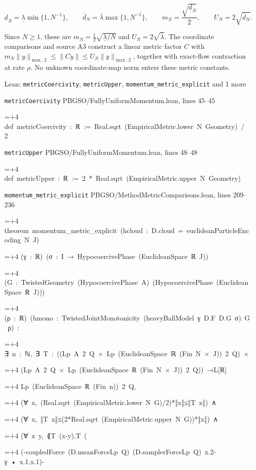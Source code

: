 \documentclass[11pt,a4paper]{report}
\newlength{\leancharwidth}
\newenvironment{leancode}{\par\smallskip\begingroup\ttfamily\footnotesize\raggedright
  \settowidth{\leancharwidth}{M}\setlength{\parskip}{0pt}\setlength{\parindent}{0pt}
  \frenchspacing}{\par\endgroup\smallskip}
\newcommand{\leanline}[2]{\hangindent=\dimexpr#1\leancharwidth+4\leancharwidth\relax
  \hangafter=1\noindent\hspace*{#1\leancharwidth}#2\par}
\newcommand{\leansource}[1]{\par{\footnotesize\color{leanmuted}#1}\par}
\begin{document}
\[\underline d_N=\underline\lambda\min\{1,N^{-1}\},\qquad\overline d_N=\overline\lambda\max\{1,N^{-1}\},\qquad m_N=\frac{\sqrt{\underline d_N}}2,\qquad U_N=2\sqrt{\overline d_N}.\]





Since \(N\ge1\), these are \(m_N=\tfrac12\sqrt{\underline\lambda/N}\) and \(U_N=2\sqrt{\overline\lambda}\). The coordinate comparisons and source A3 construct a linear metric factor \(C\) with \(m_N\|y\|_{\max,2}\le\|Cy\|\le U_N\|y\|_{\max,2}\), together with exact-flow contraction at rate \(\rho\). No unknown coordinate-map norm enters these metric constants.

\begin{leanbox}{Lean: \texttt{metricCoercivity}, \texttt{metricUpper}, \texttt{momentum\_\allowbreak{}metric\_\allowbreak{}explicit} and 1 more}
\leansource{\texttt{metricCoercivity} \quad PBGSO/\allowbreak{}FullyUniformMomentum.lean, lines 45–45}
\begin{leancode}
\leanline{0}{def\ metricCoercivity\ :\ ℝ\ :=\ Real.sqrt\ (EmpiricalMetric.lower\ N\ Geometry)\ /\ 2}
\end{leancode}
\leansource{\texttt{metricUpper} \quad PBGSO/\allowbreak{}FullyUniformMomentum.lean, lines 48–48}
\begin{leancode}
\leanline{0}{def\ metricUpper\ :\ ℝ\ :=\ 2\ *\ Real.sqrt\ (EmpiricalMetric.upper\ N\ Geometry)}
\end{leancode}
\leansource{\texttt{momentum\_\allowbreak{}metric\_\allowbreak{}explicit} \quad PBGSO/\allowbreak{}MethodMetricComparisons.lean, lines 209–236}
\begin{leancode}
\leanline{0}{theorem\ momentum\_metric\_explicit\ (hcloud\ :\ D.cloud\ =\ euclideanParticleEncoding\ N\ J)}
\leanline{4}{(γ\ :\ ℝ)\ (σ\ :\ I\ →\ HypocoercivePhase\ (EuclideanSpace\ ℝ\ J))}
\leanline{4}{(G\ :\ TwistedGeometry\ (HypocoercivePhase\ A)\ (HypocoercivePhase\ (EuclideanSpace\ ℝ\ J)))}
\leanline{4}{(ρ\ :\ ℝ)\ (hmono\ :\ TwistedJointMonotonicity\ (heavyBallModel\ γ\ D.F\ D.G\ σ)\ G\ ρ)\ :}
\leanline{4}{∃\ n\ :\ ℕ,\ ∃\ T\ :\ ((Lp\ A\ 2\ Q\ ×\ Lp\ (EuclideanSpace\ ℝ\ (Fin\ N\ ×\ J))\ 2\ Q)\ ×}
\leanline{6}{(Lp\ A\ 2\ Q\ ×\ Lp\ (EuclideanSpace\ ℝ\ (Fin\ N\ ×\ J))\ 2\ Q))\ →L[ℝ]}
\leanline{8}{Lp\ (EuclideanSpace\ ℝ\ (Fin\ n))\ 2\ Q,}
\leanline{6}{(∀\ x,\ (Real.sqrt\ (EmpiricalMetric.lower\ N\ G)/2)*‖x‖≤‖T\ x‖)\ ∧}
\leanline{6}{(∀\ x,\ ‖T\ x‖≤(2*Real.sqrt\ (EmpiricalMetric.upper\ N\ G))*‖x‖)\ ∧}
\leanline{6}{(∀\ x\ y,\ {\leanfallback ⟪}T\ (x-y),T\ (}
\leanline{8}{(-coupledForce\ (D.meanForceLp\ Q)\ (D.samplerForceLp\ Q)\ x.2-γ\ •\ x.1,x.1)-}

\end{leancode}
\end{leanbox}
\end{document}
